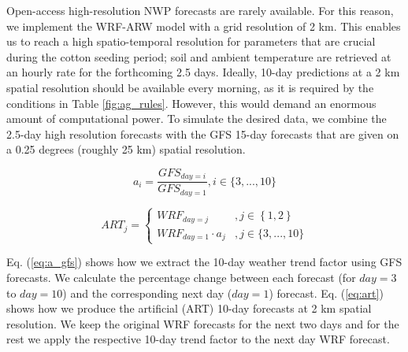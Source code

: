 \documentclass[letterpaper]{article} %
\begin{document}
Open-access high-resolution NWP forecasts are rarely available. For this reason, we implement the WRF-ARW model \cite{skamarock2019description} with a grid resolution of 2 km. This enables us to reach a high spatio-temporal resolution for parameters that are crucial during the cotton seeding period; soil and ambient temperature are retrieved at an hourly rate for the forthcoming 2.5 days.
Ideally, 10-day predictions at a 2 km spatial resolution should be available every morning, as it is required by the conditions in Table \ref{fig:ag_rules}. However, this would demand an enormous amount of computational power. To simulate the desired data, we combine the 2.5-day high resolution forecasts with the GFS \cite{cisl_rda_ds084.1} 15-day forecasts that are given on a 0.25 degrees (roughly 25 km) spatial resolution.

\begin{equation} \label{eq:a_gfs}
a_{i}= \frac{GFS_{day=i}}{GFS_{day=1}}, i\in \{3, ..., 10\}
\end{equation}

\begin{equation} \label{eq:art}
ART_{j}=\left\{
\begin{array}{ll}
WRF_{day=j} &, j\in \left \{ 1,2 \right \} \\ 
WRF_{day=1}\cdot  a_{j} &, j\in \{3, ..., 10\}
\end{array}
\right.
\end{equation}


Eq. (\ref{eq:a_gfs}) shows how we extract the 10-day weather trend factor using GFS forecasts. We calculate the percentage change between each forecast (for $day=3$ to $day=10$) and the corresponding next day ($day=1$) forecast.
Eq. (\ref{eq:art}) shows how we produce the artificial (ART) 10-day forecasts at 2 km spatial resolution. We keep the original WRF forecasts for the next two days and for the rest we apply the respective 10-day trend factor to the next day WRF forecast.
\end{document}
